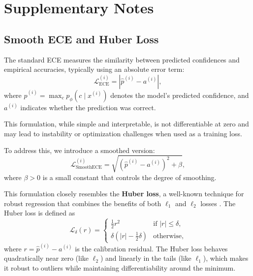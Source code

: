 \documentclass{article}
\begin{document}
\section{Supplementary Notes}

\subsection{Smooth ECE and Huber Loss} \label{ECE-Smooth}


The standard ECE measures the similarity  between predicted confidences and empirical accuracies, typically using an absolute error term:
\begin{equation}
    \mathcal{L}_{\mathrm{ECE}}^{(i)} = \left| \hat{p}^{(i)} - a^{(i)} \right|,
\end{equation}
where $\hat{p}^{(i)} = \max_{c} p_\phi(c \mid x^{(i)})$ denotes the model's predicted confidence, and $a^{(i)}$ indicates whether the prediction was correct.


This formulation, while simple and interpretable, is not differentiable at zero and may lead to instability or optimization challenges when used as a training loss.


To address this, we introduce a smoothed version:
\begin{equation}
    \mathcal{L}_{\mathrm{SmoothECE}}^{(i)} = \sqrt{ \left( \hat{p}^{(i)} - a^{(i)} \right)^2 + \beta },
\end{equation}
where $\beta > 0$ is a small constant that controls the degree of smoothing.


This formulation closely resembles the \textbf{Huber loss}, a well-known technique for robust regression that combines the benefits of both $\ell_1$ and $\ell_2$ losses \cite{huber2011robust}. The Huber loss is defined as
\begin{equation}
    \mathcal{L}_\delta(r) =
\begin{cases}
\frac{1}{2} r^2 & \text{if } |r| \leq \delta, \\
\delta \left( |r| - \frac{1}{2} \delta \right) & \text{otherwise},
\end{cases}
\end{equation}
where $r = \hat{p}^{(i)} - a^{(i)}$ is the calibration residual. The Huber loss behaves quadratically near zero (like $\ell_2$) and linearly in the tails (like $\ell_1$), which makes it robust to outliers while maintaining differentiability around the minimum.
\end{document}
